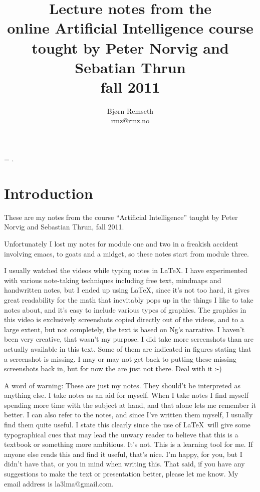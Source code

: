 \documentclass[a4, 12pt, english, USenglish]{scrreprt}
\begin{document}
\title{Lecture notes from the \\
online Artificial Intelligence course\\
tought by Peter Norvig and Sebatian Thrun \\
fall 2011}

\author{Bj\o{}rn Remseth \\ rmz@rmz.no}

\maketitle
\tableofcontents


\parskip=\bigskipamount
\parindent=0pt.

\begin{abstract}

\end{abstract}

\chapter*{Introduction}

These are my notes from the course ``Artificial Intelligence'' taught
by Peter Norvig and Sebastian Thrun, fall 2011.

Unfortunately I lost my notes for module one and two in a freakish
accident involving emacs, to goats and a midget, so these notes start
from module three.

I usually watched the videos while typing notes in \LaTeX.  I have
experimented with various note-taking techniques including free text,
mindmaps and handwritten notes, but I ended up using \LaTeX, since
it's not too hard, it gives great readability for the math that
inevitably pops up in the things I like to take notes about, and it's
easy to include various types of graphics.  The graphics in this video
is exclusively screenshots copied directly out of the videos, and to a
large extent, but not  completely, the text is based on Ng's
narrative.   I haven't been very creative, that wasn't my purpose.  I
did take more screenshots than are actually available in this text.
Some of them are indicated in figures stating that a screenshot is
missing.  I may or may not get back to putting these missing
screenshots back in, but for  now the are just not there.  Deal with
it :-)

A word of warning: These are just my notes.  They should't be
interpreted as anything else.  I take notes as an aid for myself.
When I take notes I find myself spending more time with the subject at
hand, and that alone lets me remember it better.  I can also refer to
the notes, and since I've written them myself, I usually find them
quite useful.   I state this clearly since the use of \LaTeX\ will
give some typographical cues that may lead the unwary reader to
believe that this is a textbook or something more ambitious.  It's
not.  This is a learning tool for me.  If anyone else reads this and
find it useful, that's nice. I'm happy,  for you, but I didn't have
that, or you in mind when writing this.   That said, if you have any
suggestions to make the text or presentation better, please let me
know.  My email address is la3lma@gmail.com.
\end{document}
